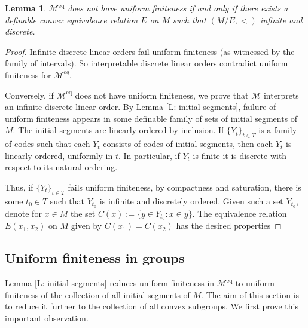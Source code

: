 \documentclass[11pt]{amsart}
\DeclareMathOperator{\eq}{eq}
\newtheorem{lemma}[theorem]{Lemma}
\theoremstyle{definition}
\newcommand{\CM}{{\mathcal M}}
\newcommand{\0}{\emptyset}
\begin{document}
\begin{lemma}\label{L: eliminating infty equiv nondiscrete}
	$\CM^{\eq}$ does not have uniform finiteness if and only if there exists a definable convex equivalence relation $E$ on $M$ such that $(M/E,<)$ infinite and discrete.
\end{lemma}
\begin{proof}
	Infinite discrete linear orders fail uniform finiteness (as witnessed by the family of intervals). So interpretable discrete linear orders contradict uniform finiteness for $\CM^{eq}$. 
    
Conversely, if $\CM^{\eq}$ does not have uniform finiteness, we prove that $\CM$ interprets an infinite discrete linear order.  By Lemma \ref{L: initial segments}, failure of uniform finiteness appears in some definable family of sets of initial segments of $M$. The initial segments are linearly ordered by inclusion. If $\{Y_t\}_{t\in T}$ is a family of codes such that each $Y_t$ consists of codes of initial segments, then each $Y_t$ is linearly ordered, uniformly in $t$. In particular, if $Y_t$ is finite it is discrete with respect to its natural ordering. 

Thus, if $\{Y_t\}_{t\in T}$ fails uniform finiteness, by compactness and saturation, there is some $t_0\in T$ such that $Y_{t_0}$ is infinite and discretely ordered. Given such a set $Y_{t_0}$, denote for $x\in M$ the set $C(x):=\{y\in Y_{t_0}: x\in y\}$.  The  equivalence  relation $E(x_1,x_2)$ on $M$ given by $C(x_1)=C(x_2)$ has the desired properties 
\end{proof}

\subsection{Uniform finiteness in groups}


Lemma \ref{L: initial segments} reduces uniform finiteness in $\CM^{\eq}$ to uniform finiteness of the collection of all initial segments of $M$. The aim of this section is to reduce it further to the collection of all convex subgroups. We first prove this important observation.
\end{document}

